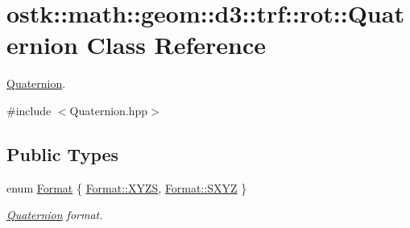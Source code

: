 \hypertarget{classostk_1_1math_1_1geom_1_1d3_1_1trf_1_1rot_1_1_quaternion}{}\section{ostk\+:\+:math\+:\+:geom\+:\+:d3\+:\+:trf\+:\+:rot\+:\+:Quaternion Class Reference}
\label{classostk_1_1math_1_1geom_1_1d3_1_1trf_1_1rot_1_1_quaternion}


\hyperlink{classostk_1_1math_1_1geom_1_1d3_1_1trf_1_1rot_1_1_quaternion}{Quaternion}.  




{\ttfamily \#include $<$Quaternion.\+hpp$>$}

\subsection*{Public Types}
\begin{DoxyCompactItemize}
\item 
enum \hyperlink{classostk_1_1math_1_1geom_1_1d3_1_1trf_1_1rot_1_1_quaternion_aa7a75f0dd505a58236ee355959e00bfd}{Format} \{ \hyperlink{classostk_1_1math_1_1geom_1_1d3_1_1trf_1_1rot_1_1_quaternion_aa7a75f0dd505a58236ee355959e00bfda11c51ecd5dc6f86ba3c1ae79e21482f5}{Format\+::\+X\+Y\+ZS}, 
\hyperlink{classostk_1_1math_1_1geom_1_1d3_1_1trf_1_1rot_1_1_quaternion_aa7a75f0dd505a58236ee355959e00bfdabd514d63fd7944bc7d3718aeef3684be}{Format\+::\+S\+X\+YZ}
 \}\begin{DoxyCompactList}\small\item\em \hyperlink{classostk_1_1math_1_1geom_1_1d3_1_1trf_1_1rot_1_1_quaternion}{Quaternion} format. \end{DoxyCompactList}
\end{DoxyCompactItemize}
